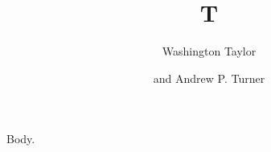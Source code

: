 \documentclass{article}
\title{T}
\author{Washington Taylor}
\author{and Andrew P. Turner}
\begin{document}
\maketitle
Body.
\end{document}
